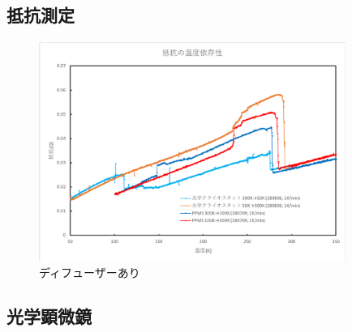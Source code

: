 \documentclass[11pt,a4paper]{jsarticle}
\begin{document}
\subsection{抵抗測定}
\begin{figure}[htbp]
  \begin{center}
   \includegraphics[width=100mm]{resistance.eps}
  \end{center}
  \caption{ディフューザーあり}
  \label{fig:resistance}
\end{figure}

\subsection{光学顕微鏡}
\end{document}
